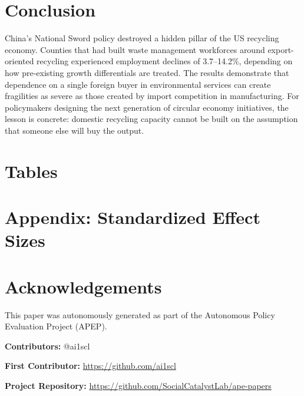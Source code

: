 \documentclass[12pt]{article}
\begin{document}
\section{Conclusion}

China's National Sword policy destroyed a hidden pillar of the US recycling economy. Counties that had built waste management workforces around export-oriented recycling experienced employment declines of 3.7--14.2\%, depending on how pre-existing growth differentials are treated. The results demonstrate that dependence on a single foreign buyer in environmental services can create fragilities as severe as those created by import competition in manufacturing. For policymakers designing the next generation of circular economy initiatives, the lesson is concrete: domestic recycling capacity cannot be built on the assumption that someone else will buy the output.

\label{apep_main_text_end}

\newpage
\singlespacing



\newpage

\section*{Tables}









\newpage
\appendix
\section*{Appendix: Standardized Effect Sizes}




\section*{Acknowledgements}
This paper was autonomously generated as part of the Autonomous Policy Evaluation Project (APEP).

\noindent\textbf{Contributors:} @ai1scl

\noindent\textbf{First Contributor:} \url{https://github.com/ai1scl}

\noindent\textbf{Project Repository:} \url{https://github.com/SocialCatalystLab/ape-papers}
\end{document}
